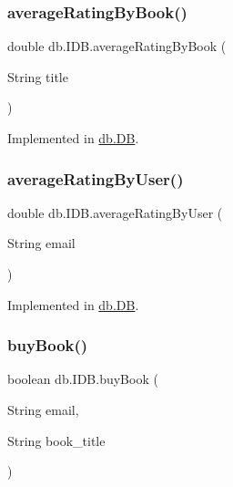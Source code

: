 \subsubsection{\texorpdfstring{average\+Rating\+By\+Book()}{averageRatingByBook()}}
{\footnotesize\ttfamily double db.\+I\+D\+B.\+average\+Rating\+By\+Book (\begin{DoxyParamCaption}\item[{String}]{title }\end{DoxyParamCaption})}



Implemented in \hyperlink{classdb_1_1_d_b_a8b2b9d6c4aabb17719e2d2af4cf7ba74}{db.\+DB}.

\mbox{\label{interfacedb_1_1_i_d_b_a5bb2209c976ab0a7f20606ed5df0e0cf}} 
\subsubsection{\texorpdfstring{average\+Rating\+By\+User()}{averageRatingByUser()}}
{\footnotesize\ttfamily double db.\+I\+D\+B.\+average\+Rating\+By\+User (\begin{DoxyParamCaption}\item[{String}]{email }\end{DoxyParamCaption})}



Implemented in \hyperlink{classdb_1_1_d_b_a38091677ae1e964a84320d6e539ea62e}{db.\+DB}.

\mbox{\label{interfacedb_1_1_i_d_b_a2ac985a90e8369fab676950b3fb4c2bc}} 
\subsubsection{\texorpdfstring{buy\+Book()}{buyBook()}}
{\footnotesize\ttfamily boolean db.\+I\+D\+B.\+buy\+Book (\begin{DoxyParamCaption}\item[{String}]{email,  }\item[{String}]{book\+\_\+title }\end{DoxyParamCaption})}




